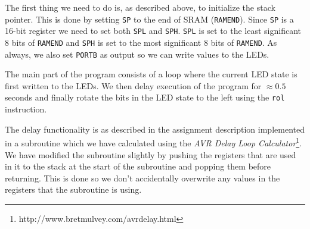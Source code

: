 The first thing we need to do is, as described above, to initialize the stack pointer. This is done by setting \texttt{SP} to the end of SRAM (\texttt{RAMEND}). Since \texttt{SP} is a 16-bit register we need to set both \texttt{SPL} and \texttt{SPH}. \texttt{SPL} is set to the least significant 8 bits of \texttt{RAMEND} and \texttt{SPH} is set to the most significant 8 bits of \texttt{RAMEND}. As always, we also set \texttt{PORTB} as output so we can write values to the LEDs.

The main part of the program consists of a loop where the current LED state is first written to the LEDs. We then delay execution of the program for $\approx 0.5$ seconds and finally rotate the bits in the LED state to the left using the \texttt{rol} instruction. 

The delay functionality is as described in the assignment description implemented in a subroutine which we have calculated using the \emph{AVR Delay Loop Calculator}\footnote{http://www.bretmulvey.com/avrdelay.html}. We have modified the subroutine slightly by pushing the registers that are used in it to the stack at the start of the subroutine and popping them before returning. This is done so we don't accidentally overwrite any values in the registers that the subroutine is using.
